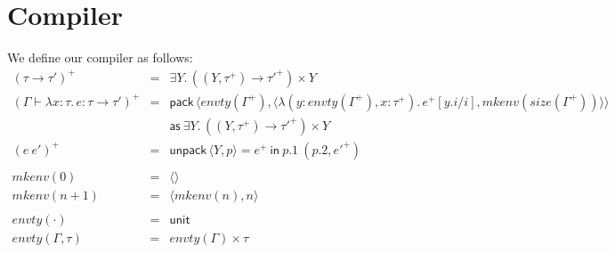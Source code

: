 \documentclass{article}
\newcommand{\lit}[1]{\textsf{#1}}
\newcommand{\decl}[2]{#1{:}#2}
\newcommand{\bind}[2]{#1.\, #2}
\newcommand{\tbind}[3]{\bind{\decl{#1}{#2}}{#3}}
\newcommand{\eunit}{\langle \rangle}
\newcommand{\epair}[2]{\langle #1, #2 \rangle}
\newcommand{\epackspaced}[5]{\lit{pack}\,\langle #1,#2 \rangle #3\lit{as}\:{\texist #4 #5}}
\newcommand{\eunpack}[4]{\lit{unpack}\,\langle #2,#3 \rangle = #1\:\lit{in}\:#4}
\newcommand{\elam}[3]{\lambda \tbind{#1}{#2}{#3}}
\newcommand{\tunit}{\lit{unit}}
\newcommand{\tprod}[2]{#1 \times #2}
\newcommand{\texist}[2]{\exists \bind{#1}{#2}}
\newcommand{\cclam}[2]{\lambda \bind{({#1})}{#2}}
\begin{document}
\section{Compiler}
We define our compiler as follows:
\[\begin{array}{lcl}
(\tau \to \tau')^+ &=&  \texist Y {\tprod{({(Y, \tau^+) \to \tau'^+})}Y}\\
(\Gamma \vdash \elam x \tau e : \tau \to \tau')^+ &=& 
	\epackspaced {envty(\Gamma^+)}
	{\epair {\cclam {y: envty(\Gamma^+), x : \tau^+} {e^+[y.i/i]}}{mkenv(size(\Gamma^+))}}{\\&&}
	Y {\tprod{({(Y, \tau^+) \to \tau'^+})}Y}\\
(e~e')^+ &=& \eunpack {e^+} Y p {p.1~ (p.2,e'^+)}\\
\\
mkenv(0) &=& \eunit\\
mkenv(n +1) &=& \epair {mkenv(n)} n\\
\\ 
envty(\cdot) &=& \tunit\\
envty(\Gamma, \tau) &=& \tprod {envty(\Gamma)} {\tau}
\end{array}\]
\end{document}
